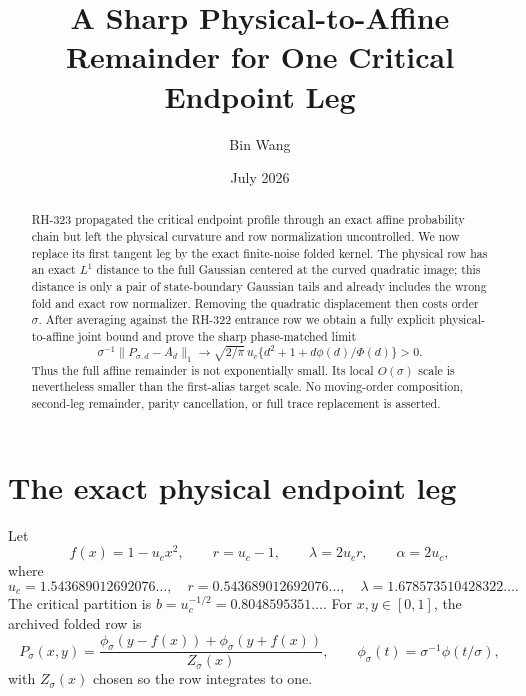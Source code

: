 \documentclass[11pt]{article}
\title{A Sharp Physical-to-Affine Remainder for One Critical Endpoint Leg}
\author{Bin Wang}
\date{July 2026}
\theoremstyle{remark}
\begin{document}
\maketitle

\begin{abstract}
RH-323 propagated the critical endpoint profile through an exact affine
probability chain but left the physical curvature and row normalization
uncontrolled.  We now replace its first tangent leg by the exact
finite-noise folded kernel.  The physical row has an exact $L^1$ distance to
the full Gaussian centered at the curved quadratic image; this distance is
only a pair of state-boundary Gaussian tails and already includes the wrong
fold and exact row normalizer.  Removing the quadratic displacement then
costs order $\sigma$.  After averaging against the RH-322 entrance row we
obtain a fully explicit physical-to-affine joint bound and prove the sharp
phase-matched limit
\[
 \sigma^{-1}\|P_{\sigma,d}-A_d\|_1
 \longrightarrow
 \sqrt{2/\pi}\,u_c\{d^2+1+d\phi(d)/\Phi(d)\}>0.
\]
Thus the full affine remainder is not exponentially small.  Its local
$O(\sigma)$ scale is nevertheless smaller than the first-alias target scale.
No moving-order composition, second-leg remainder, parity cancellation, or
full trace replacement is asserted.
\end{abstract}

\section{The exact physical endpoint leg}

Let
\[
 f(x)=1-u_cx^2,
 \qquad r=u_c-1,
 \qquad \lambda=2u_cr,
 \qquad \alpha=2u_c,
\]
where
\[
 u_c=1.543689012692076\ldots,
 \quad r=0.543689012692076\ldots,
 \quad \lambda=1.678573510428322\ldots.
\]
The critical partition is $b=u_c^{-1/2}=0.8048595351\ldots$.
For $x,y\in[0,1]$, the archived folded row is
\begin{equation}\label{eq:physical-kernel}
 P_\sigma(x,y)=
 \frac{\phi_\sigma(y-f(x))+\phi_\sigma(y+f(x))}{Z_\sigma(x)},
 \qquad
 \phi_\sigma(t)=\sigma^{-1}\phi(t/\sigma),
\end{equation}
with $Z_\sigma(x)$ chosen so the row integrates to one.
\end{document}
